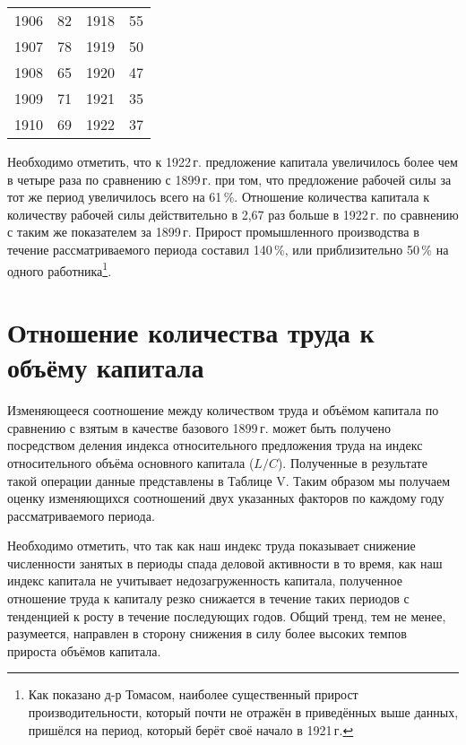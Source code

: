 \documentclass[leqno]{article}  %
\begin{document}
\begin{table}
{\begin{tabular}{p{}|p{}||p{}|p{}}
1906 & \hfill 82 & \hspace*{2.5mm} 1918 & \hfill 55 \hspace*{2.5mm} \\
1907 & \hfill 78 & \hspace*{2.5mm} 1919 & \hfill 50 \hspace*{2.5mm} \\
1908 & \hfill 65 & \hspace*{2.5mm} 1920 & \hfill 47 \hspace*{2.5mm} \\
1909 & \hfill 71 & \hspace*{2.5mm} 1921 & \hfill 35 \hspace*{2.5mm} \\
1910 & \hfill 69 & \hspace*{2.5mm} 1922 & \hfill 37 \hspace*{2.5mm} \\
\hline
\end{tabular}
}
\end{table}

\par
Необходимо отметить, что к 1922\,г. предложение капитала увеличилось более чем в четыре раза по сравнению с 1899\,г. при том, что предложение рабочей силы за тот же период увеличилось всего на 61\,\%. Отношение количества капитала к количеству рабочей силы действительно в 2,67 раз больше в 1922\,г. по сравнению с таким же показателем за 1899\,г. Прирост промышленного производства в течение рассматриваемого периода составил 140\,\%, или приблизительно 50\,\% на одного работника\footnote{Как показано д-р Томасом, наиболее существенный прирост производительности, который почти не отражён в приведённых выше данных, пришёлся на период, который берёт своё начало в 1921\,г.}.

\section{Отношение количества труда к объёму капитала}

Изменяющееся соотношение между количеством труда и объёмом капитала по сравнению с взятым в качестве базового 1899\,г. может быть получено посредством деления индекса относительного предложения труда на индекс относительного объёма основного капитала (\( L / C \)). Полученные в результате такой операции данные представлены в Таблице V. Таким образом мы получаем оценку изменяющихся соотношений двух указанных факторов по каждому году рассматриваемого периода.
\par
Необходимо отметить, что так как наш индекс труда показывает снижение численности занятых в периоды спада деловой активности в то время, как наш индекс капитала не учитывает недозагруженность капитала, полученное отношение труда к капиталу резко снижается в течение таких периодов с тенденцией к росту в течение последующих годов. Общий тренд, тем не менее, разумеется, направлен в сторону снижения в силу более высоких темпов прироста объёмов капитала.
\end{document}
